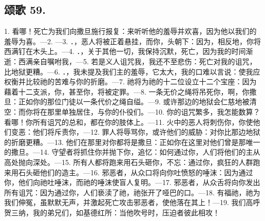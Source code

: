 
\subsection{颂歌 59.}

1. 看哪！死亡为我们向撒旦施行报复：来听听他的羞辱并欢喜，因为他以我们的羞辱为喜。—\newline{}2. —\newline{}3. ．，恶人将被正着悬挂，而你，头朝下：因为，相反地，你将西满钉在木头上。—\newline{}4. ．，关于其他一切，我保持沉默，死亡，因为我的时间渐逝：西满亲自嘱咐我，—\newline{}5. 若是义人诅咒我，我还不至悲伤：死亡对我的诅咒，比地狱更糟。—\newline{}6. ．，我未提及我们主的羞辱，它太大，我的口难以言说：使我应权衡并比较祂的苦难与你的折磨。—\newline{}7. 祂将为祂的十二位设立十二个宝座：因为藉着十二支派，你，甚至你，将被定罪。—\newline{}8. 一条无价之绳将吊死你，啊，你撒旦：正如你的那位门徒以一条代价之绳自缢。—\newline{}9. 或许那边的地狱会仁慈地被清空：而你将在那里单独居住，与你的仆役们。—\newline{}10. 你的诅咒繁多，我怎能数算？看哪！你所有诅咒的总和，都在你的肢体上。—\newline{}11. 火中的恶人将刺伤你，你使他们变恶：他们将斥责你，—\newline{}12. 罪人将辱骂你，或许他们的威胁：对你比那边地狱的折磨更糟。—\newline{}13. 他们在那里对你都将是撒旦：正如你在这里对他们曾是那唯一的撒旦。—\newline{}14. 守望者将抓住你并抛下你，追忆：如何通过你，人们将他们的主从高处抛向深处。—\newline{}15. 所有人都将跑来用石头砸你，不忘：通过你，疯狂的人群跑来用石头砸他们的造主。—\newline{}16. 邪恶者，从众口将向你吐愤怒的唾沫：因为通过你，他们向祂吐唾沫，而祂的唾沫使盲人复明。—\newline{}17. 邪恶者，从众舌将向你发出所有诅咒：因为通过你，人们亵渎了祂，祂张开了哑巴的口。—\newline{}18. 有福祂，祂为我们伸冤，虽默默无声，并激起死亡攻击邪恶者，使他落在其上！—\newline{}19. 我们高呼贺三纳，我的弟兄们，如基德红所：当他吹号时，压迫者彼此相攻！\par

